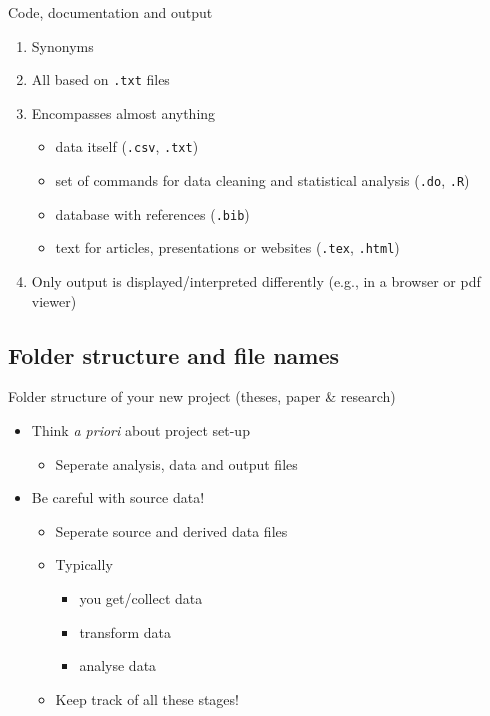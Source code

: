 \documentclass[ignorenonframetext]{beamer}
\begin{document}
{\begin{frame}[fragile]{Code, documentation and output}
\begin{enumerate}
\def\labelenumi{\arabic{enumi}.}
\item
  Synonyms
\item
  All based on \texttt{.txt} files
\item
  Encompasses almost anything

  \begin{itemize}
  \item
    data itself (\texttt{.csv}, \texttt{.txt})
  \item
    set of commands for data cleaning and statistical analysis
    (\texttt{.do}, \texttt{.R})
  \item
    database with references (\texttt{.bib})
  \item
    text for articles, presentations or websites (\texttt{.tex},
    \texttt{.html})
  \end{itemize}
\item
  Only output is displayed/interpreted differently (e.g., in a browser
  or pdf viewer)
\end{enumerate}

\end{frame}

\subsection{Folder structure and file
names}\label{folder-structure-and-file-names}

\begin{frame}{Folder structure of your new project (theses, paper \& research)}

\begin{itemize}
\item
  Think \emph{a priori} about project set-up

  \begin{itemize}
  \item
    Seperate analysis, data and output files
  \end{itemize}
\item
  Be careful with source data!

  \begin{itemize}
  \item
    Seperate source and derived data files
  \item
    Typically

    \begin{itemize}
    \item
      you get/collect data
    \item
      transform data
    \item
      analyse data
    \end{itemize}
  \item
    Keep track of all these stages!
  \end{itemize}
\end{itemize}
\end{frame}


}
\end{document}
